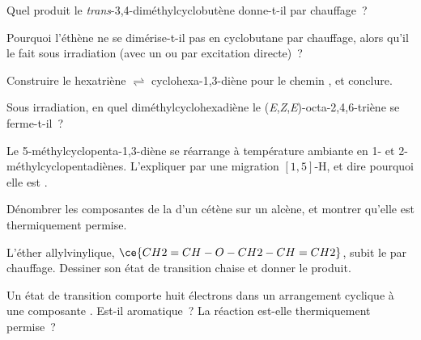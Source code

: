 \begin{exercise}[$\star$]\label{exo:b3:pericyclic:3}
Quel produit le \textit{trans}-3,4-diméthylcyclobutène donne-t-il par chauffage~?
\end{exercise}

\begin{exercise}[$\star$]\label{exo:b3:pericyclic:4}
Pourquoi l'éthène ne se dimérise-t-il pas en cyclobutane par chauffage,
alors qu'il le fait sous irradiation (avec un  ou par
excitation directe)~?
\end{exercise}

\begin{exercise}[$\star\star$]\label{exo:b3:pericyclic:5}
Construire le  hexatriène $\rightleftharpoons$ cyclohexa-1,3-diène pour le
chemin , et conclure.
\end{exercise}

\begin{exercise}[$\star\star$]\label{exo:b3:pericyclic:6}
Sous irradiation, en quel diméthylcyclohexadiène le (\textit{E},\textit{Z},\textit{E})-octa-2,4,6-triène se ferme-t-il~?
\end{exercise}

\begin{exercise}[$\star\star$]\label{exo:b3:pericyclic:7}
Le 5-méthylcyclopenta-1,3-diène se réarrange à température ambiante en 1- et
2-méthylcyclopentadiènes. L'expliquer par une migration $[1,5]$-H, et dire pourquoi elle est .
\end{exercise}

\begin{exercise}[$\star\star$]\label{exo:b3:pericyclic:8}
Dénombrer les composantes de la  d'un cétène sur un alcène, et
montrer qu'elle est thermiquement permise.
\end{exercise}

\begin{exercise}[$\star\star$]\label{exo:b3:pericyclic:9}
L'éther allylvinylique, $\ce{CH2=CH-O-CH2-CH=CH2}$, subit le  par
chauffage. Dessiner son état de transition chaise et donner le produit.
\end{exercise}

\begin{exercise}[$\star\star\star$]\label{exo:b3:pericyclic:10}
Un état de transition comporte huit électrons dans un arrangement cyclique
à une composante . Est-il aromatique~? La réaction est-elle
thermiquement permise~?
\end{exercise}

